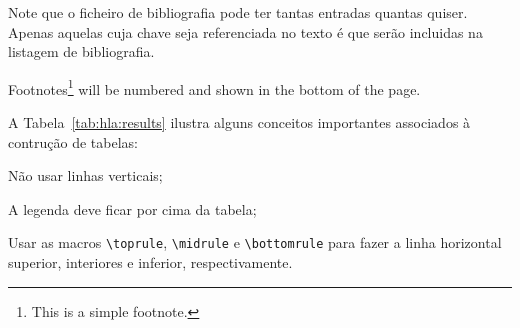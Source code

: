 Note que o ficheiro de bibliografia pode ter tantas entradas quantas quiser. Apenas aquelas cuja chave seja referenciada no texto é que serão incluidas na listagem de bibliografia.


Footnotes\footnote{This is a simple footnote.} will be numbered and shown in the bottom of the page.


A Tabela~\ref{tab:hla:results} ilustra alguns conceitos importantes associados à contrução de tabelas:
\begin{asparaenum}[i)]
  \item Não usar linhas verticais;
  \item A legenda deve ficar por cima da tabela;
  \item Usar as macros \verb!\toprule!, \verb!\midrule! e \verb!\bottomrule! para fazer a linha horizontal superior, interiores e inferior, respectivamente.
\end{asparaenum}

